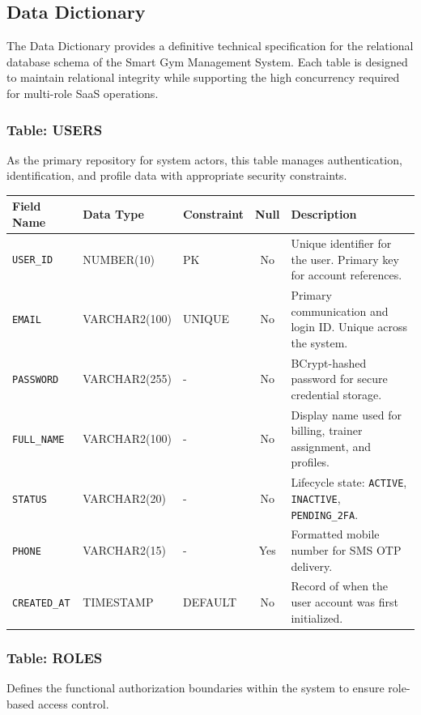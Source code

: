 \documentclass[
  12pt,
  a4paperpaper,
]{report}
\newcounter{none} %
\begin{document}
\subsection{Data Dictionary}

The Data Dictionary provides a definitive technical specification for the relational database schema of the Smart Gym Management System. Each table is designed to maintain relational integrity while supporting the high concurrency required for multi-role SaaS operations.

\subsubsection{Table: USERS}
As the primary repository for system actors, this table manages authentication, identification, and profile data with appropriate security constraints.

{\def\LTcaptype{none}
\begin{longtable}[]{@{}lllc p{6cm}@{}}
\hline
\textbf{Field Name} & \textbf{Data Type} & \textbf{Constraint} & \textbf{Null} & \textbf{Description} \\
\hline
\endhead
\hline
\endlastfoot
\texttt{USER\_ID} & NUMBER(10) & PK & No & Unique identifier for the user. Primary key for account references. \\
\texttt{EMAIL} & VARCHAR2(100) & UNIQUE & No & Primary communication and login ID. Unique across the system. \\
\texttt{PASSWORD} & VARCHAR2(255) & - & No & BCrypt-hashed password for secure credential storage. \\
\texttt{FULL\_NAME} & VARCHAR2(100) & - & No & Display name used for billing, trainer assignment, and profiles. \\
\texttt{STATUS} & VARCHAR2(20) & - & No & Lifecycle state: \texttt{ACTIVE}, \texttt{INACTIVE}, \texttt{PENDING\_2FA}. \\
\texttt{PHONE} & VARCHAR2(15) & - & Yes & Formatted mobile number for SMS OTP delivery. \\
\texttt{CREATED\_AT} & TIMESTAMP & DEFAULT & No & Record of when the user account was first initialized. \\
\hline
\end{longtable}
}

\subsubsection{Table: ROLES}
Defines the functional authorization boundaries within the system to ensure role-based access control.
\end{document}
